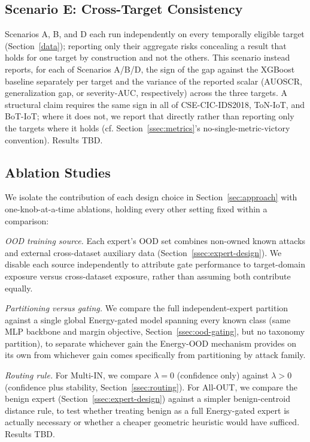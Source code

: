 \documentclass[sigconf]{acmart}
\begin{document}
\subsection{Scenario E: Cross-Target Consistency} \label{ssec:scenario-e}
Scenarios A, B, and D each run independently on every temporally eligible target (Section~\ref{data}); reporting only their aggregate risks concealing a result that holds for one target by construction and not the others. This scenario instead reports, for each of Scenarios A/B/D, the sign of the gap against the XGBoost baseline separately per target and the variance of the reported scalar (AUOSCR, generalization gap, or severity-AUC, respectively) across the three targets. A structural claim requires the same sign in all of CSE-CIC-IDS2018, ToN-IoT, and BoT-IoT; where it does not, we report that directly rather than reporting only the targets where it holds (cf. Section~\ref{ssec:metrics}'s no-single-metric-victory convention). Results TBD.

\subsection{Ablation Studies} \label{ssec:ablation}
We isolate the contribution of each design choice in Section~\ref{sec:approach} with one-knob-at-a-time ablations, holding every other setting fixed within a comparison:

\textit{OOD training source.} Each expert's OOD set combines non-owned known attacks and external cross-dataset auxiliary data (Section~\ref{ssec:expert-design}). We disable each source independently to attribute gate performance to target-domain exposure versus cross-dataset exposure, rather than assuming both contribute equally.

\textit{Partitioning versus gating.} We compare the full independent-expert partition against a single global Energy-gated model spanning every known class (same MLP backbone and margin objective, Section~\ref{ssec:ood-gating}, but no taxonomy partition), to separate whichever gain the Energy-OOD mechanism provides on its own from whichever gain comes specifically from partitioning by attack family.

\textit{Routing rule.} For Multi-IN, we compare $\lambda=0$ (confidence only) against $\lambda>0$ (confidence plus stability, Section~\ref{ssec:routing}). For All-OUT, we compare the benign expert (Section~\ref{ssec:expert-design}) against a simpler benign-centroid distance rule, to test whether treating benign as a full Energy-gated expert is actually necessary or whether a cheaper geometric heuristic would have sufficed. Results TBD.
\end{document}
